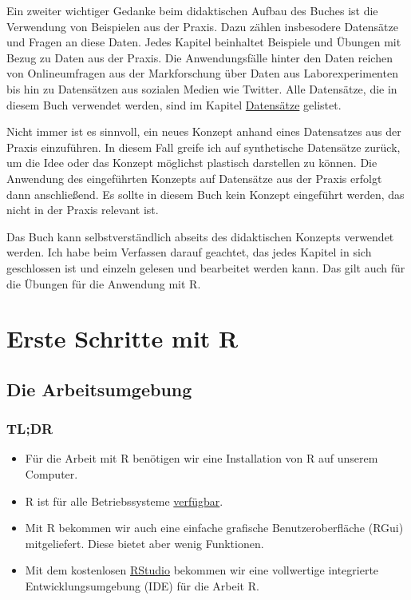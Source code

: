 \documentclass[
]{book}
\providecommand{\tightlist}{%
  \setlength{\itemsep}{0pt}\setlength{\parskip}{0pt}}
\begin{document}
Ein zweiter wichtiger Gedanke beim didaktischen Aufbau des Buches ist die Verwendung von Beispielen aus der Praxis. Dazu zählen insbesodere Datensätze und Fragen an diese Daten. Jedes Kapitel beinhaltet Beispiele und Übungen mit Bezug zu Daten aus der Praxis. Die Anwendungsfälle hinter den Daten reichen von Onlineumfragen aus der Markforschung über Daten aus Laborexperimenten bis hin zu Datensätzen aus sozialen Medien wie Twitter. Alle Datensätze, die in diesem Buch verwendet werden, sind im Kapitel \protect\hyperlink{datensaetze}{Datensätze} gelistet.

Nicht immer ist es sinnvoll, ein neues Konzept anhand eines Datensatzes aus der Praxis einzuführen. In diesem Fall greife ich auf synthetische Datensätze zurück, um die Idee oder das Konzept möglichst plastisch darstellen zu können. Die Anwendung des eingeführten Konzepts auf Datensätze aus der Praxis erfolgt dann anschließend. Es sollte in diesem Buch kein Konzept eingeführt werden, das nicht in der Praxis relevant ist.

Das Buch kann selbstverständlich abseits des didaktischen Konzepts verwendet werden. Ich habe beim Verfassen darauf geachtet, das jedes Kapitel in sich geschlossen ist und einzeln gelesen und bearbeitet werden kann. Das gilt auch für die Übungen für die Anwendung mit R.

\hypertarget{part-erste-schritte-mit-r}{%
\part*{Erste Schritte mit R}\label{part-erste-schritte-mit-r}}

\hypertarget{die-arbeitsumgebung}{%
\chapter{Die Arbeitsumgebung}\label{die-arbeitsumgebung}}

\hypertarget{tldr}{%
\section*{TL;DR}\label{tldr}}

\begin{itemize}
\tightlist
\item
  Für die Arbeit mit R benötigen wir eine Installation von R auf unserem Computer.
\item
  R ist für alle Betriebssysteme \href{https://cran.r-project.org/}{verfügbar}.
\item
  Mit R bekommen wir auch eine einfache grafische Benutzeroberfläche (RGui) mitgeliefert. Diese bietet aber wenig Funktionen.
\item
  Mit dem kostenlosen \href{https://www.rstudio.com/}{RStudio} bekommen wir eine vollwertige integrierte Entwicklungsumgebung (IDE) für die Arbeit R.
\end{itemize}
\end{document}
